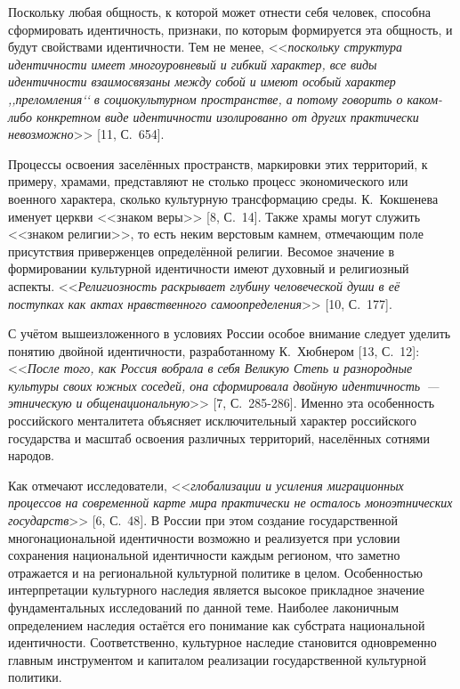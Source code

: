 Поскольку любая общность, к которой может отнести себя человек, способна сформировать идентичность, признаки, по которым формируется эта общность, и будут свойствами идентичности. Тем не менее, <<\textit{поскольку структура идентичности имеет многоуровневый и гибкий характер, все виды идентичности взаимосвязаны между собой и имеют особый характер ,,преломления‘‘ в социокультурном пространстве, а потому говорить о каком-либо конкретном виде идентичности изолированно от других практически невозможно}>> [11, С.~654].

Процессы освоения заселённых пространств, маркировки этих территорий, к примеру, храмами, представляют не столько процесс экономического или военного характера, сколько культурную трансформацию среды. К.~Кокшенева именует церкви <<знаком веры>> [8, С.~14]. Также храмы могут служить <<знаком религии>>, то есть неким верстовым камнем, отмечающим поле присутствия приверженцев определённой религии. Весомое значение в формировании культурной идентичности имеют духовный и религиозный аспекты. <<\textit{Религиозность раскрывает глубину человеческой души в её поступках как актах нравственного самоопределения}>> [10, С.~177].

С учётом вышеизложенного в условиях России особое внимание следует уделить понятию двойной идентичности, разработанному К.~Хюбнером [13, С.~12]: <<\textit{После того, как Россия вобрала в себя Великую Степь и разнородные культуры своих южных соседей, она сформировала двойную идентичность~--- этническую и общенациональную}>> [7, С.~285-286]. Именно эта особенность российского менталитета объясняет исключительный характер российского государства и масштаб освоения различных территорий, населённых сотнями народов.

Как отмечают исследователи, <<\textit{ глобализации и усиления миграционных процессов на современной карте мира практически не осталось моноэтнических государств}>> [6, С.~48]. В России при этом создание государственной многонациональной идентичности возможно и реализуется при условии сохранения национальной идентичности каждым регионом, что заметно отражается и на региональной культурной политике в целом. Особенностью интерпретации культурного наследия является высокое прикладное значение фундаментальных исследований по данной теме. Наиболее лаконичным определением наследия остаётся его понимание как субстрата национальной идентичности. Соответственно, культурное наследие становится одновременно главным инструментом и капиталом реализации государственной культурной политики.


